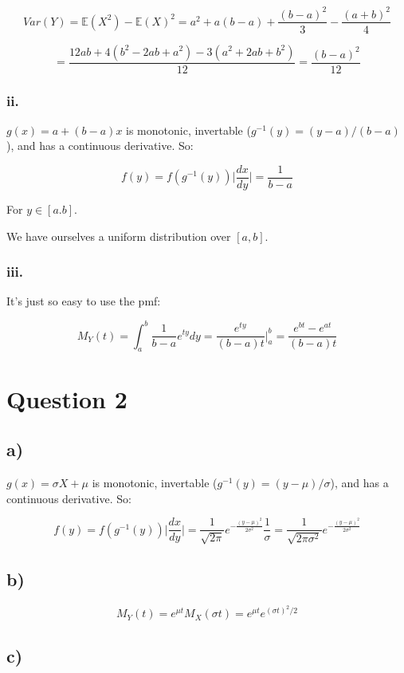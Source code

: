 \documentclass[11pt]{article}
\begin{document}
$$Var(Y) = \mathbb{E}(X^2) - \mathbb{E}(X)^2 = a^2+a(b-a)+\frac{(b-a)^2}{3} - \frac{(a+b)^2}{4}$$

$$=\frac{12ab+4(b^2 - 2ab + a^2)-3(a^2 + 2ab + b^2)}{12}=\frac{(b-a)^2}{12}$$

\subsubsection*{ii.}

$g(x)=a+(b-a)x$ is monotonic, invertable ($g^{-1}(y) = (y-a) / (b - a)$), and has a continuous derivative. So:

$$f(y) = f(g^{-1}(y))\Big| \frac{dx}{dy} \Big|=\frac{1}{b - a}$$

For $y\in [a.b]$.

We have ourselves a uniform distribution over $[a,b]$.

\subsubsection*{iii.}

It's just so easy to use the pmf:

$$M_Y(t) = \int_a^{b}\frac{1}{b - a}e^{ty}dy = \frac{e^{ty}}{(b-a)t}\Big|_a^b=\frac{e^{bt}-e^{at}}{(b-a)t}$$

\section*{Question 2}

\subsection*{a)}

$g(x)=\sigma X + \mu$ is monotonic, invertable ($g^{-1}(y) = (y - \mu) /\sigma$), and has a continuous derivative. So:

$$f(y) = f(g^{-1}(y))\Big| \frac{dx}{dy} \Big| = \frac{1}{\sqrt{2 \pi}}e^{-\frac{(y-\mu)^2}{2\sigma^2}}\frac{1}{\sigma}=\frac{1}{\sqrt{2 \pi \sigma^2}}e^{-\frac{(y-\mu)^2}{2\sigma^2}}$$

\subsection*{b)}

$$M_Y(t) = e^{\mu t}M_X(\sigma t)=e^{\mu t}e^{(\sigma t)^2/2}$$

\subsection*{c)}
\end{document}

